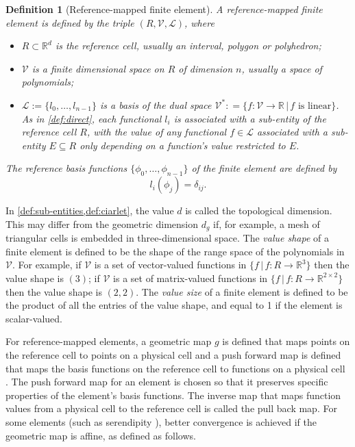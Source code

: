 \documentclass[sn-mathphys-num]{sn-jnl}%
\theoremstyle{thmstyleone}%
\newcommand{\subentity}{E}
\newcommand{\refel}{R}
\newcommand{\polyspace}{\mathcal{V}}
\newcommand{\dualbasis}{\mathcal{L}}
\newcommand{\dual}[1]{#1^*}
\theoremstyle{thmstyletwo}%
\theoremstyle{thmstylethree}%
\newtheorem{definition}{Definition}%
\begin{document}
\begin{definition}[Reference-mapped finite element]\label{def:ciarlet}
A reference-mapped finite element is defined by the triple
$(\refel,\polyspace,\dualbasis)$, where
\begin{itemize}
  \item $\refel\subset\mathbb{R}^d$ is the reference cell, usually an interval, polygon or polyhedron;
  \item $\polyspace$ is a finite dimensional space on $\refel$
  of dimension $n$, usually a space of polynomials;
  \item $\dualbasis :=\{l_0,\dots,l_{n-1}\}$ is a basis of the dual space
  $\dual{\polyspace} : =\{f:\polyspace\to\mathbb{R}\,|\,f\text{ is linear}\}$.
  As in \cref{def:direct}, each functional $l_i$ is associated with a sub-entity of the reference cell $\refel$, with the value of any functional 
  $f\in\dualbasis$ associated with a sub-entity $\subentity\subseteq\refel$ only depending on a function's value
  restricted to $\subentity$.

\end{itemize}
%
The reference basis functions $\{\phi_0,\dots,\phi_{n-1}\}$ of the finite element are
defined by
%
\[
  l_i(\phi_j)=\delta_{ij}.
\]
\end{definition}

In \cref{def:sub-entities,def:ciarlet}, the value $d$ is called the topological dimension. This may differ from the geometric dimension $d_g$ if, for example,
a mesh of triangular cells is embedded in three-dimensional space. The \emph{value shape} of a finite element is defined
to be the shape of the range space of the polynomials in $\polyspace$. For example,
if $\polyspace$ is a set of vector-valued functions in $\{f\,|\,f:\refel\to\mathbb{R}^3\}$ then the value shape is $(3)$;
if $\polyspace$ is a set of matrix-valued functions in $\{f\,|\,f:\refel\to\mathbb{R}^{2\times2}\}$ then the value shape is $(2,2)$.
The \emph{value size} of a finite element is defined to be the product of all the entries of the value shape, and equal to 1
if the element is scalar-valued.

For reference-mapped elements, a geometric map $g$ is defined that maps points on the reference cell
to points on a physical cell and
a push forward map is defined that maps the basis functions on the
reference cell to functions on a physical cell
\cite{rognes:2009,mapping2,mapping3}. The push forward map for an element is
chosen so that it preserves specific properties of the element's basis functions.
The inverse map that maps function values from a physical cell to the reference cell is called the pull back map.
For some elements (such as serendipity \cite{serendipity}), better
convergence is achieved if the geometric map is affine, as defined as follows.
\end{document}
